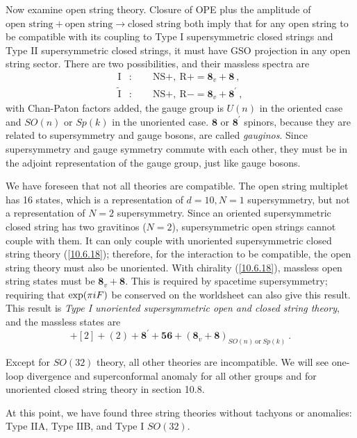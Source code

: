 	Now examine open string theory. Closure of OPE plus the amplitude of $\text{open string}+\text{open string}\to\text{closed string}$ both imply that for any open string to be compatible with its coupling to Type I supersymmetric closed strings and Type II supersymmetric closed strings, it must have GSO projection in any open string sector. There are two possibilities, and their massless spectra are
	\begin{align*}
		\text{I}&:\qquad \text{NS}+,\:\text{R}+ = \mathbf{8}_{v} +\mathbf{8} \: , \\
		\tilde{\text{I}}&:\qquad \text{NS}+,\:\text{R}- = \mathbf{8}_{v} +\mathbf{8}^{\prime} \: ,
	\end{align*}
	with Chan-Paton factors added, the gauge group is $U(n)$ in the oriented case and $SO(n)$ or $Sp(k)$ in the unoriented case. $\mathbf{8}$ or $\mathbf{8}^{\prime}$ spinors, because they are related to supersymmetry and gauge bosons, are called \emph{gauginos}. Since supersymmetry and gauge symmetry commute with each other, they must be in the adjoint representation of the gauge group, just like gauge bosons. 
	
	We have foreseen that not all theories are compatible. The open string multiplet has 16 states, which is a representation of $d=10, N=1$ supersymmetry, but not a representation of $N=2$ supersymmetry. Since an oriented supersymmetric closed string has two gravitinos ($N=2$), supersymmetric open strings cannot couple with them. It can only couple with unoriented supersymmetric closed string theory (\ref{10.6.18}); therefore, for the interaction to be compatible, the open string theory must also be unoriented. With chirality (\ref{10.6.18}), massless open string states must be $\mathbf{8}_{v}+\mathbf{8}$. This is required by spacetime supersymmetry; requiring that $\exp(\pi i F)$ be conserved on the worldsheet can also give this result. This result is \emph{Type I unoriented supersymmetric open and closed string theory}, and the massless states are
	\begin{equation}
		[0]+[2]+(2)+\mathbf{8}^{\prime}+\mathbf{56} + (\mathbf{8}_{v}+\mathbf{8})_{SO(n)\:\text{or}\:Sp(k)} \:.\label{10.6.19}
	\end{equation}
	
	Except for $SO(32)$ theory, all other theories are incompatible. We will see one-loop divergence and superconformal anomaly for all other groups and for unoriented closed string theory in section 10.8.
	
	At this point, we have found three string theories without tachyons or anomalies: Type IIA, Type IIB, and Type I $SO(32)$.
	
